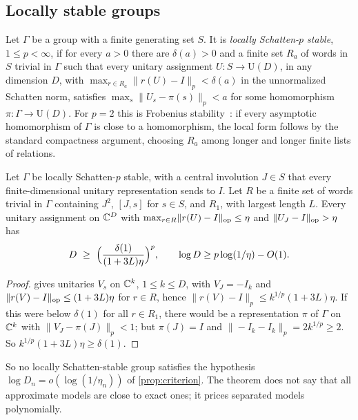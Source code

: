 \subsection{Locally stable groups}\label{app:floor-stable}

Let $\Gamma$ be a group with a finite generating set $S$. It is \emph{locally Schatten-$p$ stable}, $1\le p<\infty$, if for every
$a>0$ there are $\delta(a)>0$ and a finite set $R_a$ of words in $S$ trivial in $\Gamma$ such that every unitary assignment
$U:S\to\mathrm U(D)$, in any dimension $D$, with $\max_{r\in R_a}\|r(U)-I\|_p<\delta(a)$ in the unnormalized Schatten norm, satisfies
$\max_s\|U_s-\pi(s)\|_p<a$ for some homomorphism $\pi:\Gamma\to\mathrm U(D)$. For $p=2$ this is Frobenius
stability~\cite{DGLT20,BLSW23}: if every asymptotic homomorphism of $\Gamma$ is close to a homomorphism, the local form follows by the
standard compactness argument, choosing $R_a$ among longer and longer finite lists of relations.

\begin{theorem}\label{thm:stable}
Let $\Gamma$ be locally Schatten-$p$ stable, with a central involution $J\in S$ that every finite-dimensional unitary representation
sends to $I$. Let $R$ be a finite set of words trivial in $\Gamma$ containing $J^2$, $[J,s]$ for $s\in S$, and $R_1$, with largest
length $L$. Every unitary assignment on $\mathbb C^D$ with $\max_{r\in R}\lVert r(U)-I\rVert_{\mathrm{op}}\le\eta$ and $\lVert U_J-I\rVert_{\mathrm{op}}>\eta$ has
\[
D\ \ge\ \Bigl(\frac{\delta(1)}{(1+3L)\eta}\Bigr)^p,\qquad\log D\ge p\log(1/\eta)-O(1).
\]
\end{theorem}

\begin{proof}
 gives unitaries $V_s$ on $\mathbb C^k$, $1\le k\le D$, with $V_J=-I_k$ and $\lVert r(V)-I\rVert_{\mathrm{op}}\le(1+3L)\eta$ for $r\in R$, hence
$\|r(V)-I\|_p\le k^{1/p}(1+3L)\eta$. If this were below $\delta(1)$ for all $r\in R_1$, there would be a representation $\pi$ of
$\Gamma$ on $\mathbb C^k$ with $\|V_J-\pi(J)\|_p<1$; but $\pi(J)=I$ and $\|-I_k-I_k\|_p=2k^{1/p}\ge2$. So $k^{1/p}(1+3L)\eta\ge\delta(1)$.
\end{proof}

So no locally Schatten-stable group satisfies the hypothesis $\log D_n=o(\log(1/\eta_n))$ of \cref{prop:criterion}. The theorem does
not say that all approximate models are close to exact ones; it prices separated models polynomially.

